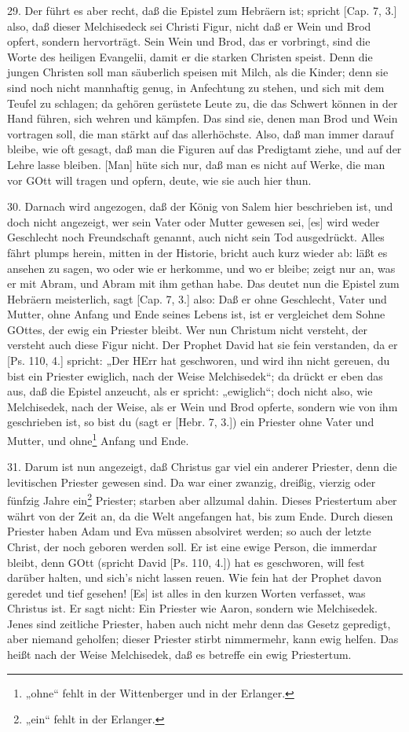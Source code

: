29. Der führt es aber recht, daß die Epistel zum Hebräern ist; spricht [Cap. 7, 3.] also, daß dieser Melchisedeck sei Christi Figur, nicht daß er Wein und Brod opfert, sondern hervorträgt. Sein Wein und Brod, das er vorbringt, sind die Worte des heiligen Evangelii, damit er die starken Christen speist. Denn die jungen Christen soll man säuberlich speisen mit Milch, als die Kinder; denn sie sind noch nicht mannhaftig genug, in Anfechtung zu stehen, und sich mit dem Teufel zu schlagen; da gehören gerüstete Leute zu, die das Schwert können in der Hand führen, sich wehren und kämpfen. Das sind sie, denen man Brod und Wein vortragen soll, die man stärkt auf das allerhöchste. Also, daß man immer darauf bleibe, wie oft gesagt, daß man die Figuren auf das Predigtamt ziehe, und auf der Lehre lasse bleiben. [Man] hüte sich nur, daß man es nicht auf Werke, die man vor GOtt will tragen und opfern, deute, wie sie auch hier thun.

30. Darnach wird angezogen, daß der König von Salem hier beschrieben ist, und doch nicht angezeigt, wer sein Vater oder Mutter gewesen sei, [es] wird weder Geschlecht noch Freundschaft genannt, auch nicht sein Tod ausgedrückt. Alles fährt plumps herein, mitten in der Historie, bricht auch kurz wieder ab: läßt es ansehen zu sagen, wo oder wie er herkomme, und wo er bleibe; zeigt nur an, was er mit Abram, und Abram mit ihm gethan habe. Das deutet nun die Epistel zum Hebräern meisterlich, sagt [Cap. 7, 3.] also: Daß er ohne Geschlecht, Vater und Mutter, ohne Anfang und Ende seines Lebens ist, ist er vergleichet dem Sohne GOttes, der ewig ein Priester bleibt. Wer nun Christum nicht versteht, der versteht auch diese Figur nicht. Der Prophet David hat sie fein verstanden, da er [Ps. 110, 4.] spricht: „Der HErr hat geschworen, und wird ihn nicht gereuen, du bist ein Priester ewiglich, nach der Weise Melchisedek“; da drückt er eben das aus, daß die Epistel anzeucht, als er spricht: „ewiglich“; doch nicht also, wie Melchisedek, nach der Weise, als er Wein und Brod opferte, sondern wie von ihm geschrieben ist, so bist du (sagt er [Hebr. 7, 3.]) ein Priester ohne Vater und Mutter, und ohne\footnote{„ohne“ fehlt in der Wittenberger und in der Erlanger.} Anfang und Ende.

31. Darum ist nun angezeigt, daß Christus gar viel ein anderer Priester, denn die levitischen Priester gewesen sind. Da war einer zwanzig, dreißig, vierzig oder fünfzig Jahre ein\footnote{„ein“ fehlt in der Erlanger.} Priester; starben aber allzumal dahin. Dieses Priestertum aber währt von der Zeit an, da die Welt angefangen hat, bis zum Ende. Durch diesen Priester haben Adam und Eva müssen absolviret werden; so auch der letzte Christ, der noch geboren werden soll. Er ist eine ewige Person, die immerdar bleibt, denn GOtt (spricht David [Ps. 110, 4.]) hat es geschworen, will fest darüber halten, und sich’s nicht lassen reuen. Wie fein hat der Prophet davon geredet und tief gesehen! [Es] ist alles in den kurzen Worten verfasset, was Christus ist. Er sagt nicht: Ein Priester wie Aaron, sondern wie Melchisedek. Jenes sind zeitliche Priester, haben auch nicht mehr denn das Gesetz gepredigt, aber niemand geholfen; dieser Priester stirbt nimmermehr, kann ewig helfen. Das heißt nach der Weise Melchisedek, daß es betreffe ein ewig Priestertum.

